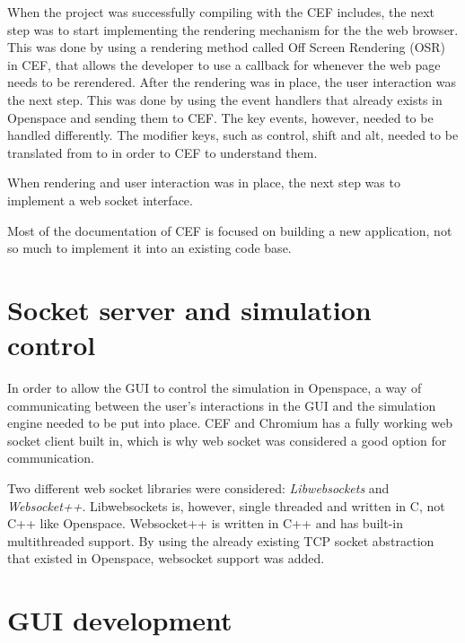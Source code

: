 When the project was successfully compiling with the CEF includes, the next step was to start implementing the rendering mechanism for the the web browser. This was done by using a rendering method called Off Screen Rendering (OSR) in CEF, that allows the developer to use a callback for whenever the web page needs to be rerendered. After the rendering was in place, the user interaction was the next step. This was done by using the event handlers that already exists in Openspace and sending them to CEF. The key events, however, needed to be handled differently. The modifier keys, such as control, shift and alt, needed to be translated from  to  in order to CEF to understand them.

When rendering and user interaction was in place, the next step was to implement a web socket interface.

Most of the documentation of CEF is focused on building a new application, not so much to implement it into an existing code base. 

\section{Socket server and simulation control}

In order to allow the GUI to control the simulation in Openspace, a way of communicating between the user's interactions in the GUI and the simulation engine needed to be put into place. CEF and Chromium has a fully working web socket client built in, which is why web socket was considered a good option for communication.

Two different web socket libraries were considered: \emph{Libwebsockets} and \emph{Websocket++}. Libwebsockets is, however, single threaded and written in C, not C++ like Openspace. \cite{lwssingle} Websocket++ is written in C++ and has built-in multithreaded support. By using the already existing TCP socket abstraction that existed in Openspace, websocket support was added.


\section{GUI development}



